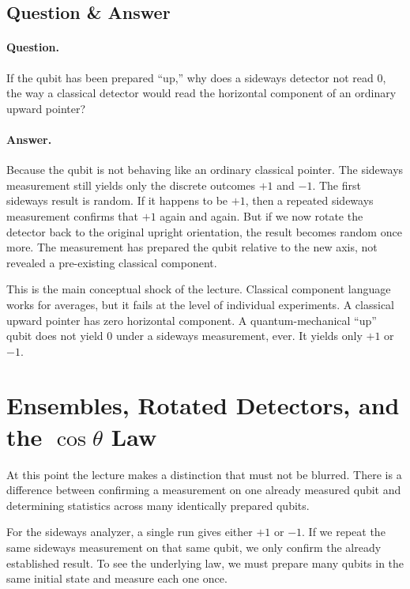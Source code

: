 \subsection{Question \& Answer}

\paragraph{Question.} If the qubit has been prepared ``up,'' why does a sideways detector not read \(0\), the way a classical detector would read the horizontal component of an ordinary upward pointer?

\paragraph{Answer.} Because the qubit is not behaving like an ordinary classical pointer. The sideways measurement still yields only the discrete outcomes \(+1\) and \(-1\). The first sideways result is random. If it happens to be \(+1\), then a repeated sideways measurement confirms that \(+1\) again and again. But if we now rotate the detector back to the original upright orientation, the result becomes random once more. The measurement has prepared the qubit relative to the new axis, not revealed a pre-existing classical component.

This is the main conceptual shock of the lecture. Classical component language works for averages, but it fails at the level of individual experiments. A classical upward pointer has zero horizontal component. A quantum-mechanical ``up'' qubit does not yield \(0\) under a sideways measurement, ever. It yields only \(+1\) or \(-1\).

\section{Ensembles, Rotated Detectors, and the \(\cos\theta\) Law}

At this point the lecture makes a distinction that must not be blurred. There is a difference between confirming a measurement on one already measured qubit and determining statistics across many identically prepared qubits.

For the sideways analyzer, a single run gives either \(+1\) or \(-1\). If we repeat the same sideways measurement on that same qubit, we only confirm the already established result. To see the underlying law, we must prepare many qubits in the same initial state and measure each one once.

